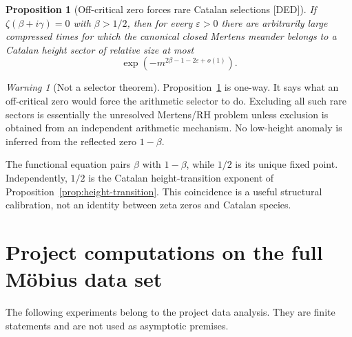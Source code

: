 \documentclass[11pt]{amsart}
\numberwithin{equation}{section}
\theoremstyle{plain}
\newtheorem{proposition}[theorem]{Proposition}
\theoremstyle{definition}
\theoremstyle{remark}
\newtheorem{warning}[theorem]{Warning}
\newcommand{\eps}{\varepsilon}
\newcommand{\DED}{\textup{[DED]}}
\begin{document}
\begin{proposition}[Off-critical zero forces rare Catalan selections \DED]
\label{prop:offcritical-catalan}
If $\zeta(\beta+i\gamma)=0$ with $\beta>1/2$, then for every $\eps>0$ there are arbitrarily large compressed times for which the canonical
closed Mertens meander belongs to a Catalan height sector of relative size at most
\begin{equation}
\exp\!\left(-m^{2\beta-1-2\eps+o(1)}\right).
\label{eq:offcritical-catalan-rarity}
\end{equation}
\end{proposition}

\begin{warning}[Not a selector theorem]
\label{warn:offcritical-not-proof}
Proposition~\ref{prop:offcritical-catalan} is one-way.  It says what an off-critical zero would force the arithmetic selector to do.
Excluding all such rare sectors is essentially the unresolved Mertens/RH problem unless exclusion is obtained from an independent
arithmetic mechanism.  No low-height anomaly is inferred from the reflected zero $1-\beta$.
\end{warning}

The functional equation pairs $\beta$ with $1-\beta$, while $1/2$ is its unique fixed point.  Independently, $1/2$ is the Catalan
height-transition exponent of Proposition~\ref{prop:height-transition}.  This coincidence is a useful structural calibration, not an
identity between zeta zeros and Catalan species.

\section{Project computations on the full M\"obius data set}
\label{sec:project-computations}

The following experiments belong to the project data analysis.  They are finite statements and are not used as asymptotic premises.
\end{document}
